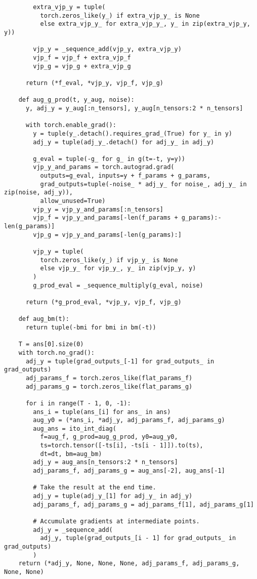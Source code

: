 \documentclass[twoside]{article}
\begin{document}
\begin{verbatim}
        extra_vjp_y = tuple(
          torch.zeros_like(y_) if extra_vjp_y_ is None 
          else extra_vjp_y_ for extra_vjp_y_, y_ in zip(extra_vjp_y, y))

        vjp_y = _sequence_add(vjp_y, extra_vjp_y)
        vjp_f = vjp_f + extra_vjp_f
        vjp_g = vjp_g + extra_vjp_g

      return (*f_eval, *vjp_y, vjp_f, vjp_g)

    def aug_g_prod(t, y_aug, noise):
      y, adj_y = y_aug[:n_tensors], y_aug[n_tensors:2 * n_tensors]

      with torch.enable_grad():
        y = tuple(y_.detach().requires_grad_(True) for y_ in y)
        adj_y = tuple(adj_y_.detach() for adj_y_ in adj_y)

        g_eval = tuple(-g_ for g_ in g(t=-t, y=y))
        vjp_y_and_params = torch.autograd.grad(
          outputs=g_eval, inputs=y + f_params + g_params,
          grad_outputs=tuple(-noise_ * adj_y_ for noise_, adj_y_ in zip(noise, adj_y)),
          allow_unused=True)
        vjp_y = vjp_y_and_params[:n_tensors]
        vjp_f = vjp_y_and_params[-len(f_params + g_params):-len(g_params)]
        vjp_g = vjp_y_and_params[-len(g_params):]

        vjp_y = tuple(
          torch.zeros_like(y_) if vjp_y_ is None 
          else vjp_y_ for vjp_y_, y_ in zip(vjp_y, y)
        )
        g_prod_eval = _sequence_multiply(g_eval, noise)

      return (*g_prod_eval, *vjp_y, vjp_f, vjp_g)

    def aug_bm(t):
      return tuple(-bmi for bmi in bm(-t))

    T = ans[0].size(0)
    with torch.no_grad():
      adj_y = tuple(grad_outputs_[-1] for grad_outputs_ in grad_outputs)
      adj_params_f = torch.zeros_like(flat_params_f)
      adj_params_g = torch.zeros_like(flat_params_g)

      for i in range(T - 1, 0, -1):
        ans_i = tuple(ans_[i] for ans_ in ans)
        aug_y0 = (*ans_i, *adj_y, adj_params_f, adj_params_g)
        aug_ans = ito_int_diag(
          f=aug_f, g_prod=aug_g_prod, y0=aug_y0,
          ts=torch.tensor([-ts[i], -ts[i - 1]]).to(ts),
          dt=dt, bm=aug_bm)
        adj_y = aug_ans[n_tensors:2 * n_tensors]
        adj_params_f, adj_params_g = aug_ans[-2], aug_ans[-1]

        # Take the result at the end time.
        adj_y = tuple(adj_y_[1] for adj_y_ in adj_y)
        adj_params_f, adj_params_g = adj_params_f[1], adj_params_g[1]

        # Accumulate gradients at intermediate points.
        adj_y = _sequence_add(
          adj_y, tuple(grad_outputs_[i - 1] for grad_outputs_ in grad_outputs)
        )
    return (*adj_y, None, None, None, adj_params_f, adj_params_g, None, None)
\end{verbatim}
  
\end{document}
